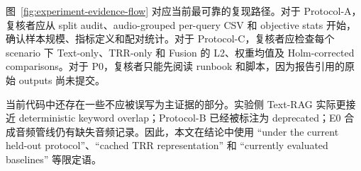 图~\ref{fig:experiment-evidence-flow} 对应当前最可靠的复现路径。对于 Protocol-A，复核者应从 split audit、audio-grouped per-query CSV 和 objective stats 开始，确认样本规模、指标定义和配对统计。对于 Protocol-C，复核者应检查每个 scenario 下 Text-only、TRR-only 和 Fusion 的 L2、权重均值及 Holm-corrected comparisons。对于 P0，复核者只能先阅读 runbook 和脚本，因为报告引用的原始 outputs 尚未提交。

当前代码中还存在一些不应被误写为主证据的部分。实验侧 Text-RAG 实际更接近 deterministic keyword overlap；Protocol-B 已经被标注为 deprecated；E0 合成音频管线仍有缺失音频记录。因此，本文在结论中使用 “under the current held-out protocol”、“cached TRR representation” 和 “currently evaluated baselines” 等限定语。

